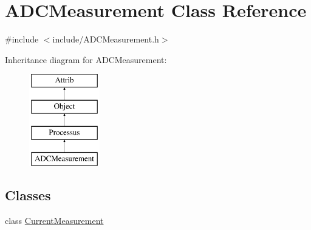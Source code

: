 \hypertarget{classADCMeasurement}{}\section{A\+D\+C\+Measurement Class Reference}
\label{classADCMeasurement}


{\ttfamily \#include $<$include/\+A\+D\+C\+Measurement.\+h$>$}

Inheritance diagram for A\+D\+C\+Measurement\+:\begin{figure}[H]
\begin{center}
\leavevmode
\includegraphics[height=4.000000cm]{classADCMeasurement}
\end{center}
\end{figure}
\subsection*{Classes}
\begin{DoxyCompactItemize}
\item 
class \hyperlink{classADCMeasurement_1_1CurrentMeasurement}{Current\+Measurement}
\end{DoxyCompactItemize}
